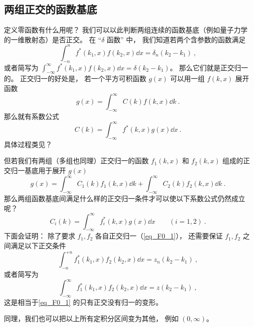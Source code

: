 \subsection{两组正交的函数基底}
定义零函数有什么用呢？ 我们可以以此判断两组连续的函数基底（例如量子力学的一维散射态）是否正交。 在 “$\delta$ 函数” 中， 我们知道若两个含参数的函数满足
\begin{equation}\label{eq_F0_1}
\int_{-n}^{n} f^*(k_1, x) f(k_2, x)\dd{x} = \delta_n(k_2 - k_1)~,
\end{equation}
或者简写为 $\int_{-\infty}^{\infty} f^*(k_1, x) f(k_2, x)\dd{x} = \delta(k_2 - k_1)$。 那么它们就是正交归一的。 正交归一的好处是， 若一个平方可积函数 $g(x)$ 可以用一组 $f(k, x)$ 展开函数
\begin{equation}
g(x) = \int_{-\infty}^{\infty} C(k) f(k, x) \dd{k}~.
\end{equation}
那么就有系数公式
\begin{equation}
C(k) = \int_{-\infty}^{\infty} f^*(k, x)g(x)\dd{x}~.
\end{equation}
具体过程类见？

但若我们有两组（多组也同理）正交归一的函数 $f_1(k, x)$ 和 $f_2(k, x)$ 组成的正交归一基底用于展开 $g(x)$
\begin{equation}\label{eq_F0_3}
g(x) = \int_{-\infty}^{\infty} C_1(k) f_1(k, x) \dd{k} + \int_{-\infty}^{\infty} C_2(k) f_2(k, x) \dd{k}~.
\end{equation}
那么两组函数基底间满足什么样的正交归一条件才可以使以下系数公式仍然成立呢？
\begin{equation}\label{eq_F0_4}
C_i(k) = \int_{-\infty}^{\infty} f_i^*(k, x)g(x)\dd{x} \qquad (i = 1,2)~.
\end{equation}
下面会证明： 除了要求 $f_1, f_2$ 各自正交归一（\autoref{eq_F0_1}）， 还需要保证 $f_1, f_2$ 之间满足以下正交条件
\begin{equation}
\int_{-n}^{+n} f_1^*(k_1, x) f_2(k_2, x) \dd{x} = z_n(k_2 - k_1)~,
\end{equation}
或者简写为
\begin{equation}
\int_{-\infty}^{\infty} f_1^*(k_1, x) f_2(k_2, x) \dd{x} = z(k_2 - k_1)~,
\end{equation}
这是相当于\autoref{eq_F0_1} 的只有正交没有归一的变形。

同理，我们也可以把以上所有定积分区间变为其他， 例如 $(0, \infty)$。

